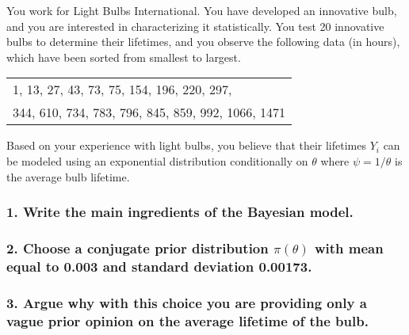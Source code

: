 \documentclass[
]{article}
\begin{document}
You work for Light Bulbs International. You have developed an innovative
bulb, and you are interested in characterizing it statistically. You
test 20 innovative bulbs to determine their lifetimes, and you observe
the following data (in hours), which have been sorted from smallest to
largest.

\begin{table}[!h]
\centering
\begin{tabular}{l}
1, 13, 27, 43, 73, 75, 154, 196, 220, 297,\\
344, 610, 734, 783, 796, 845, 859, 992, 1066, 1471
\end{tabular}
\end{table}

Based on your experience with light bulbs, you believe that their
lifetimes \(Y_i\) can be modeled using an exponential distribution
conditionally on \(\theta\) where \(\psi = 1/\theta\) is the average
bulb lifetime.

\hypertarget{write-the-main-ingredients-of-the-bayesian-model.}{%
\subsubsection{1. Write the main ingredients of the Bayesian
model.}\label{write-the-main-ingredients-of-the-bayesian-model.}}

\hypertarget{choose-a-conjugate-prior-distribution-pitheta-with-mean-equal-to-0.003-and-standard-deviation-0.00173.}{%
\subsubsection{\texorpdfstring{2. Choose a conjugate prior distribution
\(\pi(\theta)\) with mean equal to 0.003 and standard deviation
0.00173.}{2. Choose a conjugate prior distribution \textbackslash pi(\textbackslash theta) with mean equal to 0.003 and standard deviation 0.00173.}}\label{choose-a-conjugate-prior-distribution-pitheta-with-mean-equal-to-0.003-and-standard-deviation-0.00173.}}

\hypertarget{argue-why-with-this-choice-you-are-providing-only-a-vague-prior-opinion-on-the-average-lifetime-of-the-bulb.}{%
\subsubsection{3. Argue why with this choice you are providing only a
vague prior opinion on the average lifetime of the
bulb.}\label{argue-why-with-this-choice-you-are-providing-only-a-vague-prior-opinion-on-the-average-lifetime-of-the-bulb.}}
\end{document}
